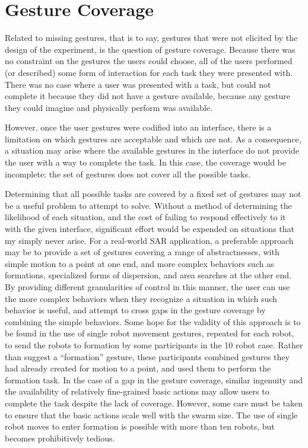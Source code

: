 \section{Gesture Coverage}

Related to missing gestures, that is to say, gestures that were not elicited by the design of the experiment, is the question of gesture coverage. 
Because  there was no constraint on the gestures the users could choose, all of the users performed (or described) some form of interaction for each task they were presented with. 
There was no case where a user was presented with a task, but could not complete it because they did not have a gesture available, because any gesture they could imagine and physically perform was available. 

However, once the user gestures were codified into an interface, there is a limitation on which gestures are acceptable and which are not. 
As a consequence, a situation may arise where the available gestures in the interface do not provide the user with a way to complete the task. 
In this case, the coverage would be incomplete: the set of gestures does not cover all the possible tasks. 

Determining that all possible tasks are covered by a fixed set of gestures may not be a useful problem to attempt to solve. 
Without a method of determining the likelihood of each situation, and the cost of failing to respond effectively to it with the given interface, significant effort would be expended on situations that my simply never arise. 
For a real-world SAR application, a preferable approach may be to provide a set of gestures covering a range of abstractnesses, with simple motion to a point at one end, and more complex behaviors such as formations, specialized forms of dispersion, and area searches at the other end. 
By providing different granularities of control in this manner, the user can use the more complex behaviors when they recognize a situation in which such behavior is useful, and attempt to cross gaps in the gesture coverage by combining the simple behaviors. 
Some hope for the validity of this approach is to be found in the use of single robot movement gestures, repeated for each robot, to send the robots to formation by some participants in the 10 robot case. 
Rather than suggest a ``formation'' gesture, these participants combined gestures they had already created for motion to a point, and used them to perform the formation task. 
In the case of a gap in the gesture coverage, similar ingenuity and the availability of relatively fine-grained basic actions may allow users to complete the task despite the lack of coverage. 
However, some care must be taken to ensure that the basic actions scale well with the swarm size. 
The use of single robot moves to enter formation is possible with more than ten robots, but becomes prohibitively tedious. 